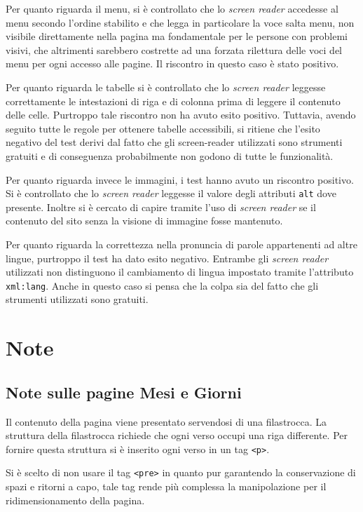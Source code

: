 \documentclass[10pt,a4paper,onecolumn]{article}
\newcommand{\inglese}[1]{\foreignlanguage{english}{\itshape{}#1}}
\begin{document}
Per quanto riguarda il menu, si è controllato che lo \inglese{screen reader} accedesse al menu secondo l'ordine stabilito e che legga in particolare la voce salta menu, non visibile direttamente nella pagina ma fondamentale per le persone con problemi visivi, che altrimenti sarebbero costrette ad una forzata rilettura delle voci del menu per ogni accesso alle pagine. Il riscontro in questo caso è stato positivo.

Per quanto riguarda le tabelle si è controllato che lo \inglese{screen reader} leggesse correttamente le intestazioni di riga e di colonna prima di leggere il contenuto delle celle. Purtroppo tale riscontro non ha avuto esito positivo. Tuttavia, avendo seguito tutte le regole per ottenere tabelle accessibili, si ritiene che l'esito negativo del test derivi dal fatto che gli screen-reader utilizzati sono strumenti gratuiti e di conseguenza probabilmente non godono di tutte le funzionalità.

Per quanto riguarda invece le immagini, i test hanno avuto un riscontro positivo. Si è controllato che lo \inglese{screen reader} leggesse il valore degli attributi \texttt{alt} dove presente. Inoltre si è cercato di capire tramite l'uso di \inglese{screen reader} se il contenuto del sito senza la visione di immagine fosse mantenuto.

Per quanto riguarda la correttezza nella pronuncia di parole appartenenti ad altre lingue, purtroppo il test ha dato esito negativo. Entrambe gli \inglese{screen reader} utilizzati non distinguono il cambiamento di lingua impostato tramite l'attributo  \texttt{xml:lang}.  Anche in questo caso si pensa che la colpa sia del fatto che gli strumenti utilizzati sono gratuiti.





\section{Note}
\subsection{Note sulle pagine Mesi e Giorni}
Il contenuto della pagina viene presentato servendosi di una filastrocca. La struttura della filastrocca richiede che ogni verso occupi una riga differente. Per fornire questa struttura si è inserito ogni verso in un tag \texttt{<p>}.

Si è scelto di non usare il tag \texttt{<pre>} in quanto pur garantendo la conservazione di spazi e ritorni a capo, tale tag rende più complessa la manipolazione per il ridimensionamento della pagina.
\end{document}
